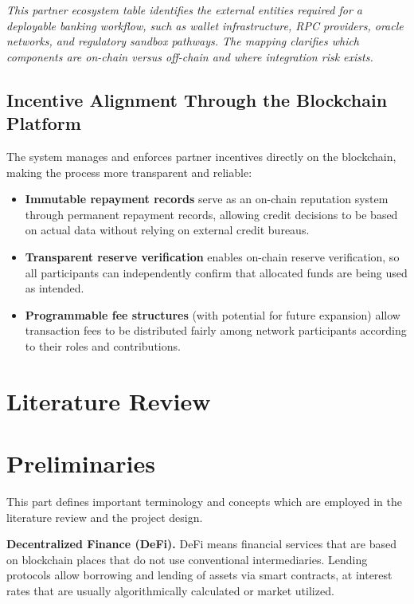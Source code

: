 \documentclass[acmsmall,screen,review]{acmart}
\begin{document}
\vspace{2pt}
\noindent\textit{\small This partner ecosystem table identifies the external entities required for a deployable banking workflow, such as wallet infrastructure, RPC providers, oracle networks, and regulatory sandbox pathways. The mapping clarifies which components are on-chain versus off-chain and where integration risk exists.}

\subsection{Incentive Alignment Through the Blockchain Platform}

The system manages and enforces partner incentives directly on the blockchain, making the process more transparent and reliable:

\begin{itemize}[noitemsep]
\item \textbf{Immutable repayment records} serve as an on-chain reputation system through permanent repayment records, allowing credit decisions to be based on actual data without relying on external credit bureaus.
\item \textbf{Transparent reserve verification} enables on-chain reserve verification, so all participants can independently confirm that allocated funds are being used as intended.
\item \textbf{Programmable fee structures} (with potential for future expansion) allow transaction fees to be distributed fairly among network participants according to their roles and contributions.
\end{itemize}


\section{Literature Review}

\section{Preliminaries}

This part defines important terminology and concepts which are employed in the literature review and the project design.

\hangindent=0.5in \textbf{Decentralized Finance (DeFi).} DeFi means financial services that are based on blockchain places that do not use conventional intermediaries. Lending protocols allow borrowing and lending of assets via smart contracts, at interest rates that are usually algorithmically calculated or market utilized.
\end{document}

